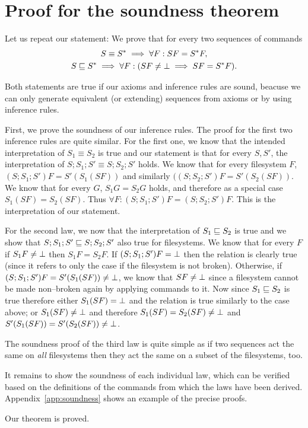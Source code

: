 \section{Proof for the soundness theorem}
\label{app:theosound}

Let us repeat our statement:
We prove that for every two sequences of commands 
\begin{gather*}
S\equiv S^* \implies \forall F: SF=S^*F,\\
S\sqsubseteq S^* \implies \forall F:(SF\ne\bot \implies SF=S^*F).
\end{gather*}

Both statements are true if our axioms and inference rules are sound,
beacuse
we can only generate equivalent (or extending) sequences from axioms
or by using inference rules.

First, we prove the soundness of our inference rules. The proof for the
first two inference rules are quite similar. For the first one, we know
that the intended interpretation of \(S_1\equiv S_2\) is true and our
statement is that for every \(S,S'\), the interpretation of
\(S;S_1;S'\equiv S;S_2;S'\) holds. 
We know that for every filesystem
\(F\), \((S;S_1;S')F=S'(S_1(SF))\) and similarly
\(((S;S_2;S')F=S'(S_2(SF))\). We know that for every
\(G\), \(S_1G=S_2G\) holds, and therefore
as a special case \(S_1(SF)=S_2(SF)\). Thus
\(\forall F: (S;S_1;S')F=(S;S_2;S')F\). This is the interpretation of our
statement.

For the second law, we now that the interpretation of 
\(S_1\sqsubseteq S_2\) is true and we show that
\(S;S_1;S'\sqsubseteq S;S_2;S'\) also true for filesystems. 
We know that for every \(F\) if \(S_1F\ne\bot\) then \(S_1F=S_2F\). If
\((S;S_1;S')F=\bot\) then the relation is clearly true (since it refers to
only the case if the filesystem is not broken). Otherwise, if
\((S;S_1;S')F=S'(S_1(SF))\ne\bot\), we know that \(SF\ne\bot\) since
a filesystem cannot be made non--broken again by applying commands to it.
Now since \(S_1\sqsubseteq S_2\) is true therefore either 
\(S_1(SF)=\bot\) and the relation is true similarly to the case above;
or \(S_1(SF)\ne\bot\) and therefore
\(S_1(SF)=S_2(SF)\ne\bot\) and \(S'(S_1(SF))=S'(S_2(SF))\ne\bot\).

The soundness proof of the third law is quite simple as if two
sequences act the same on \emph{all} filesystems then they act the same on
a subset of the filesystems, too.

It remains to show the soundness of each individual law,
which can be verified based on the definitions of the commands from which
the laws have been derived.
Appendix~\ref{app:soundness} shows an example of the precise proofs.

Our theorem is proved.

